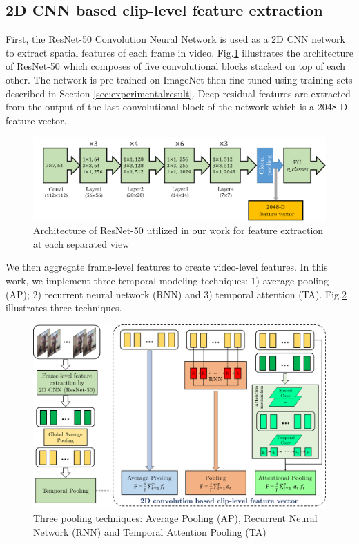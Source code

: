 
\subsection{2D CNN based clip-level feature extraction}
    First, the ResNet-50 Convolution Neural Network \cite{he2016deep} is used as a 2D CNN network to extract spatial features of each frame in video. Fig.\ref{fig:resnet50} illustrates the architecture of ResNet-50 which composes of five convolutional blocks stacked on top of each other. The network is pre-trained on ImageNet then fine-tuned using training sets described in Section \ref{sec:experimentalresult}. Deep residual features are extracted from the output of the last convolutional block of the network which is a 2048-D feature vector. 
    \begin{figure}[htbp]
        \centering
        \includegraphics[width=1\linewidth]{Figs/Resnet50.png}
        \caption{Architecture of ResNet-50 utilized in our work for feature extraction at each separated view}
        \label{fig:resnet50}
    \end{figure}
    We then aggregate frame-level features to create video-level features. In this work, we implement three temporal modeling techniques: 1) average pooling (AP); 2) recurrent neural network (RNN) and 3) temporal attention (TA). Fig.\ref{fig:pooling} illustrates three techniques.
    \begin{figure}[htbp]
        \centering
        \includegraphics[width=1\linewidth]{Figs/Pooling.png}
        \caption{Three pooling techniques: Average Pooling (AP), Recurrent Neural Network (RNN) and Temporal Attention Pooling (TA)}
        \label{fig:pooling}
    \end{figure}

